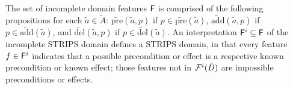 \documentclass[letterpaper]{article}
\newenvironment{packed_itemize}{
\begin{itemize}
  \setlength{\itemsep}{1pt}
  \setlength{\parskip}{0pt}
  \setlength{\parsep}{0pt}
}{\end{itemize}}
\begin{document}
The set of incomplete domain features ${\sf F}$ is comprised of the
following propositions for each $\tilde{a} \in \tilde{A}$:
 $\widetilde{\text{pre}}(\tilde{a}, p)$ if $p \in
 \widetilde{\text{pre}}(\tilde{a})$, $\widetilde{\text{add}}(\tilde{a}, p)$ if
 $p \in \widetilde{\text{add}}(\tilde{a})$, and
 $\widetilde{\text{del}}(\tilde{a}, p)$ if $p \in
 \widetilde{\text{del}}(\tilde{a})$.
An interpretation ${\sf F}^i \subseteq {\sf F}$ of the
incomplete STRIPS domain defines a STRIPS domain, in that every feature $f \in
{\sf F}^i$ indicates that a possible precondition or effect is a
respective known precondition or known effect; those features not in ${\cal
F}^i(\tilde{D})$ are impossible preconditions or effects.
\end{document}
